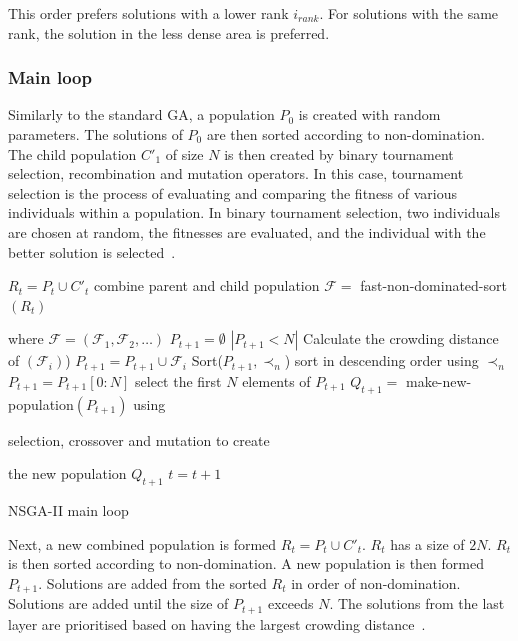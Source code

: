 This order prefers solutions with a lower rank $i_{rank}$. For solutions with the same rank, the solution in the less dense area is preferred.

\subsubsection{Main loop}

Similarly to the standard GA, a population $P_{0}$ is created with random parameters. The solutions of $P_0$ are then sorted according to non-domination. The child population $C'_{1}$ of size $N$ is then created by binary tournament selection, recombination and mutation operators. In this case, tournament selection is the process of evaluating and comparing the fitness of various individuals within a population. In binary tournament selection, two individuals are chosen at random, the fitnesses are evaluated, and the individual with the better solution is selected~\cite{AbdRahman2016}. 



\begin{algorithm}[b]
	\begin{algorithmic}[1]
		\State $R_t=P_t \cup C'_t$ combine parent and child population
		\State $\mathcal{F} = $ fast-non-dominated-sort $(R_t)$ 
		
		where $\mathcal{F}=(\mathcal{F}_1, \mathcal{F}_2,\ldots)$
		\State $P_{t+1}=\emptyset$
		\While $\left|P_{t+1}<N\right|$
		\State Calculate the crowding distance of $(\mathcal{F}_i)$)
		\State $P_{t+1}=P_{t+1}\cup \mathcal{F}_i$
		\EndWhile
		\State Sort($P_{t+1}, \prec_n$) sort in descending order using $\prec_n$
		\State $P_{t+1} = P_{t+1}[0:N]$ select the first $N$ elements of $P_{t+1}$
		\State $Q_{t+1} = $ make-new-population$(P_{t+1})$ using 
		
		selection, crossover and mutation to create 
		
		the new population $Q_{t+1}$
		\State $t=t+1$
		\caption{NSGA-II main loop \cite{Valkanas2014}}
		\label{algo:nsga2}
	\end{algorithmic}
\end{algorithm}


Next, a new combined population is formed $R_{t}=P_{t} \cup C'_{t}$. $R_t$ has a size of $2N$. $R_t$ is then sorted according to non-domination. A new population is then formed $P_{t+1}$. Solutions are added from the sorted $R_t$ in order of non-domination. Solutions are added until the size of $P_{t+1}$ exceeds $N$. The solutions from the last layer are prioritised based on having the largest crowding distance~\cite{Valkanas2014}.


